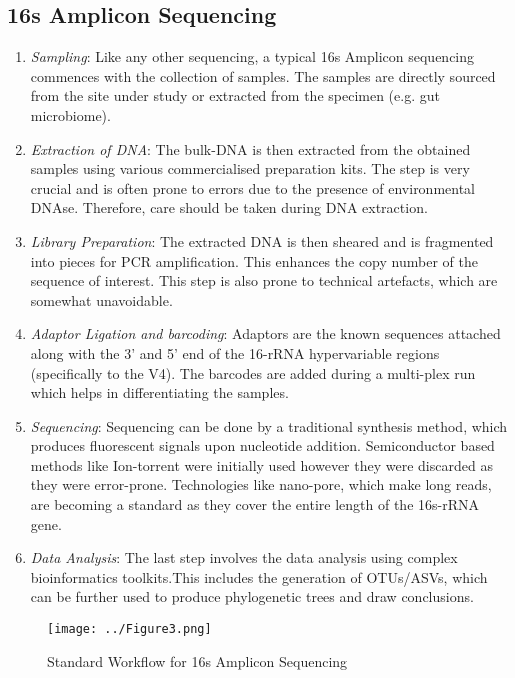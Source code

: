 \subsection{16s Amplicon Sequencing}

\begin{enumerate}
  \item \textit{Sampling}: Like any other sequencing, a typical 16s Amplicon sequencing commences with the collection of samples. The samples are directly sourced from the site under study or extracted from the specimen (e.g. gut microbiome).
  \item \textit{Extraction of DNA}: The bulk-DNA is then extracted from the obtained samples using various commercialised preparation kits. The step is very crucial and is often prone to errors due to the presence of environmental DNAse. Therefore, care should be taken during DNA extraction.
  \item \textit{Library Preparation}: The extracted DNA is then sheared and is fragmented into pieces for PCR amplification. This enhances the copy number of the sequence of interest. This step is also prone to technical artefacts, which are somewhat unavoidable. 
  \item \textit{Adaptor Ligation and barcoding}: Adaptors are the known sequences attached along with the 3' and 5' end of the 16-rRNA hypervariable regions (specifically to the V4). The barcodes are added during a multi-plex run which helps in differentiating the samples.
  \item \textit{Sequencing}: Sequencing can be done by a traditional synthesis method, which produces fluorescent signals upon nucleotide addition. Semiconductor based methods like Ion-torrent were initially used however they were discarded as they were error-prone. Technologies like nano-pore, which make long reads, are becoming a standard as they cover the entire length of the 16s-rRNA gene.
  \item \textit{Data Analysis}: The last step involves the data analysis using complex bioinformatics toolkits.This includes the generation of OTUs/ASVs, which can be further used to produce phylogenetic trees and draw conclusions.
\end{enumerate}

\begin{figure}[!hb]
  \centering
  \texttt{[image: ../Figure3.png]}
  \caption{Standard Workflow for 16s Amplicon Sequencing}
  \label{fig:figure3}
\end{figure}

